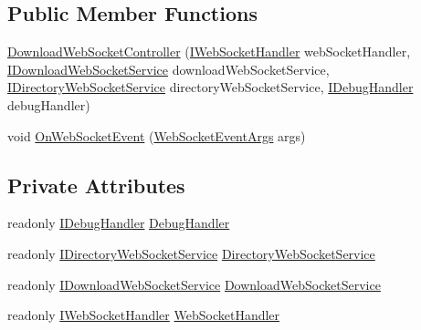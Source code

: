 \subsection*{Public Member Functions}
\begin{DoxyCompactItemize}
\item 
\mbox{\hyperlink{class_little_weeb_library_1_1_controllers_1_1_download_web_socket_controller_adb8f6706c45d35e72ffb9cca7e768605}{Download\+Web\+Socket\+Controller}} (\mbox{\hyperlink{interface_little_weeb_library_1_1_handlers_1_1_i_web_socket_handler}{I\+Web\+Socket\+Handler}} web\+Socket\+Handler, \mbox{\hyperlink{interface_little_weeb_library_1_1_services_1_1_i_download_web_socket_service}{I\+Download\+Web\+Socket\+Service}} download\+Web\+Socket\+Service, \mbox{\hyperlink{interface_little_weeb_library_1_1_services_1_1_i_directory_web_socket_service}{I\+Directory\+Web\+Socket\+Service}} directory\+Web\+Socket\+Service, \mbox{\hyperlink{interface_little_weeb_library_1_1_handlers_1_1_i_debug_handler}{I\+Debug\+Handler}} debug\+Handler)
\item 
void \mbox{\hyperlink{class_little_weeb_library_1_1_controllers_1_1_download_web_socket_controller_a9e5e421ed57b8b2a294e17d93d027c53}{On\+Web\+Socket\+Event}} (\mbox{\hyperlink{class_little_weeb_library_1_1_event_arguments_1_1_web_socket_event_args}{Web\+Socket\+Event\+Args}} args)
\end{DoxyCompactItemize}
\subsection*{Private Attributes}
\begin{DoxyCompactItemize}
\item 
readonly \mbox{\hyperlink{interface_little_weeb_library_1_1_handlers_1_1_i_debug_handler}{I\+Debug\+Handler}} \mbox{\hyperlink{class_little_weeb_library_1_1_controllers_1_1_download_web_socket_controller_a0dd1bc44e7a4b9e246d4ed07f6f51c59}{Debug\+Handler}}
\item 
readonly \mbox{\hyperlink{interface_little_weeb_library_1_1_services_1_1_i_directory_web_socket_service}{I\+Directory\+Web\+Socket\+Service}} \mbox{\hyperlink{class_little_weeb_library_1_1_controllers_1_1_download_web_socket_controller_aadc888a9484668d089275c1a7b7e9237}{Directory\+Web\+Socket\+Service}}
\item 
readonly \mbox{\hyperlink{interface_little_weeb_library_1_1_services_1_1_i_download_web_socket_service}{I\+Download\+Web\+Socket\+Service}} \mbox{\hyperlink{class_little_weeb_library_1_1_controllers_1_1_download_web_socket_controller_a980b36f961f8ebf5f2c682e6ae206aeb}{Download\+Web\+Socket\+Service}}
\item 
readonly \mbox{\hyperlink{interface_little_weeb_library_1_1_handlers_1_1_i_web_socket_handler}{I\+Web\+Socket\+Handler}} \mbox{\hyperlink{class_little_weeb_library_1_1_controllers_1_1_download_web_socket_controller_a052dcf8f2c820e57f6be9d26bcbb5817}{Web\+Socket\+Handler}}
\end{DoxyCompactItemize}



